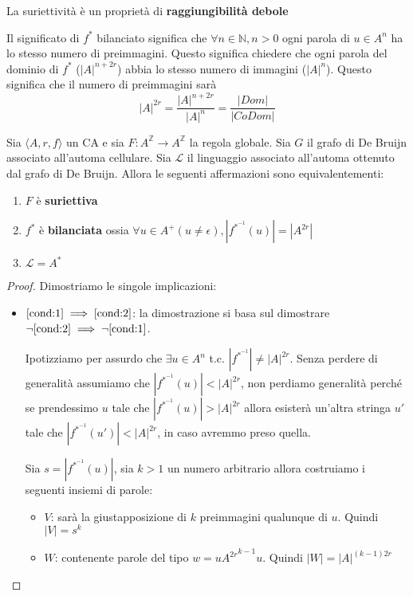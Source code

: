 La suriettività è un proprietà di \textbf{raggiungibilità debole}

\begin{nota}
    Il significato di $f^{\ast}$ bilanciato significa che $\forall n\in \mathbb{N}, n>0$
    ogni parola di $u\in A^n$ ha lo stesso numero di preimmagini. Questo significa
    chiedere che ogni parola del dominio di $f^{\ast}$ ($|A|^{n+2r}$) abbia lo stesso 
    numero di immagini ($|A|^n$). Questo significa che il numero di preimmagini
    sarà
    \begin{equation*}
        |A|^{2r} = \frac{|A|^{n+2r}}{|A|^n} = \frac{|Dom|}{|CoDom|}
    \end{equation*}
\end{nota}

\begin{teorema}
    Sia $\langle A,r,f\rangle$ un CA e sia $F: A^\mathbb{Z}\rightarrow A^\mathbb{Z}$
    la regola globale. Sia $G$ il grafo di De Bruijn associato all'automa cellulare.
    Sia $\mathcal{L}$ il linguaggio associato all'automa ottenuto dal grafo di De Bruijn.
    Allora le seguenti affermazioni sono equivalentementi:
    \begin{enumerate}
        \item \label{cond:1}$F$ è \textbf{suriettiva}
        \item \label{cond:2}$f^\ast$ è \textbf{bilanciata} ossia $\forall u \in A^+ (u\ne \epsilon), |f^{\ast^{-1}}(u)|= |A^{2r}|$
        \item \label{cond:3}$\mathcal{L} = A^\ast$
    \end{enumerate}
    \begin{proof}
        Dimostriamo le singole implicazioni:
        \begin{itemize}
            \item $\ref{cond:1}\implies \ref{cond:2}$: la dimostrazione si basa 
            sul dimostrare $\lnot \ref{cond:2}\implies \lnot \ref{cond:1}$.

            Ipotizziamo per assurdo che $\exists u\in A^n$ t.c. $|f^{\ast^{-1}}|\ne |A|^{2r}$.
            Senza perdere di generalità assumiamo che $|f^{\ast^{-1}}(u)|< |A|^{2r}$,
            non perdiamo generalità perché se prendessimo $u$ tale che $|f^{\ast^{-1}}(u)|> |A|^{2r}$
            allora esisterà un'altra stringa $u'$ tale che $|f^{\ast^{-1}}(u')|< |A|^{2r}$,
            in caso avremmo preso quella.

            Sia $s = |f^{\ast^{-1}}(u)|$, sia $k>1$ un numero arbitrario allora costruiamo
            i seguenti insiemi di parole:
            \begin{itemize}
                \item $V$: sarà la giustapposizione di $k$ preimmagini qualunque 
                di $u$. Quindi $|V| = s^k$
                \item $W$: contenente parole del tipo $w={uA^{2r}}^{k-1}u$. Quindi $|W| = |A|^{(k-1)2r}$
            \end{itemize}


\end{itemize}
\end{proof}
\end{teorema}
